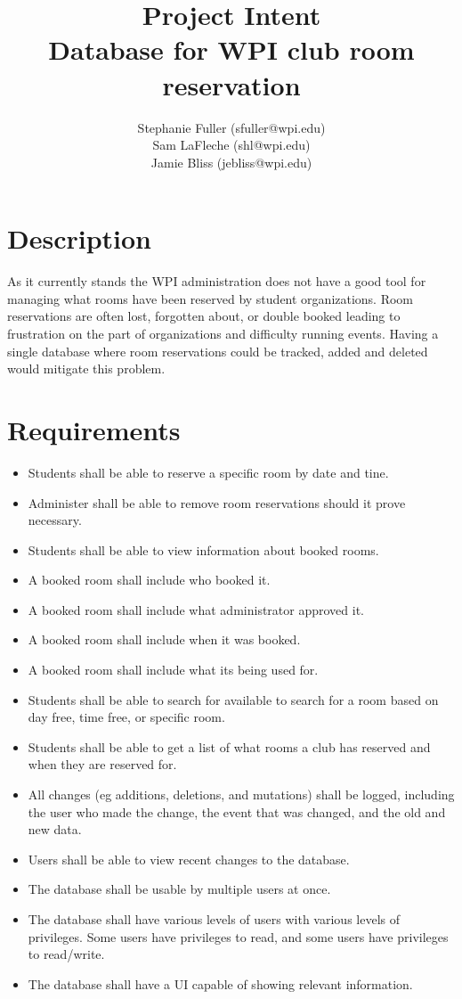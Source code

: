 \documentclass{article}
\title{Project Intent\\Database for WPI club room reservation}
\author{Stephanie Fuller (sfuller@wpi.edu)\\ Sam LaFleche (shl@wpi.edu)\\ Jamie
Bliss (jebliss@wpi.edu)}
\begin{document}
\maketitle

\section{Description}
As it currently stands the WPI administration does not have a good tool for
managing what rooms have been reserved by student organizations. Room
reservations are often lost, forgotten about, or double booked leading to
frustration on the part of organizations and difficulty running events. Having a
single database where room reservations could be tracked, added and deleted
would mitigate this problem.

\section{Requirements}
\begin{itemize}
\item 
Students shall be able to reserve a specific room by date and tine.
\item
Administer shall be able to remove room reservations should it prove
necessary.
\item
Students shall be able to view information about booked rooms.
\item
A booked room shall include who booked it.
\item A booked room shall include what administrator approved it.
\item A booked room shall include when it was booked.
\item A booked room shall include what its being used for.
\item
Students shall be able to search for available to search for a room based on day
free, time free, or specific room.
\item
Students shall be able to get a list of what rooms a club has reserved and when
they are reserved for.
\item
All changes (eg additions, deletions, and mutations) shall be logged, including the
user who made the change, the event that was changed, and the old and new
data.
\item
Users shall be able to view recent changes to the database.
\item
The database shall be usable by multiple users at once.
\item
The database shall have various levels of users with various levels of
privileges. Some users have privileges to read, and some users have privileges to
read/write.
\item
The database shall have a UI capable of showing relevant information.
\end{itemize}
\end{document}
